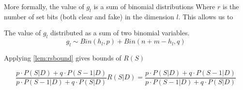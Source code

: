 \documentclass[11pt]{article}
\begin{document}
More formally, the value of $g_l$ is a sum of binomial distributions 
Where $r$ is the number of set bits (both clear and fake) in the dimension $l$.   This allows us to 



The value of $g_l$ distributed as a sum of two binomial variables.  
\[ g_l  \sim Bin(h_l,p) + Bin(n+m-h_l,q) \]
 
 
Applying \eqref{lem:rsbound} gives bounds of $R(S)$

\begin{equation} \label{eq:rsbounds}
 \frac{p \cdot P(S | D ) + q \cdot P( S - 1 | D) } {  p  \cdot P(S -1 | D ) + q \cdot P( S  | D)  } R(S|D)=  \frac{p \cdot P(S | D ) + q \cdot P( S - 1 | D) } {  p  \cdot P(S -1 | D ) + q \cdot P( S  | D)  }
\end{equation}
\end{document}
